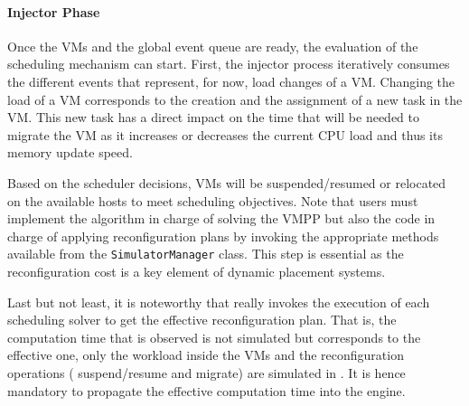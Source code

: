 \paragraph{Injector Phase}
Once the VMs and the global event queue are ready, the evaluation of
the scheduling mechanism can start. First, the injector process
iteratively consumes the different events that represent, for now, load changes of a VM.
Changing the load of
a VM corresponds to the creation and the assignment of a new \sg task
in the VM. This new task has a direct impact on the time that will be
needed to migrate the VM as it increases or decreases the current CPU
load and thus %
its memory update speed.
%

Based on the scheduler decisions, VMs will be suspended/resumed
or relocated on the available hosts to meet scheduling objectives. %
Note that users must implement the algorithm in
charge of solving the VMPP but also the code in charge of applying
reconfiguration plans by invoking the appropriate methods available
from the \texttt{SimulatorManager} class. This step is essential as
the reconfiguration cost is a key element of dynamic placement
systems.

Last but not least, it is noteworthy that \vmps really invokes the
execution of each scheduling solver to get the effective
reconfiguration plan.  That is, the computation time that is observed
is not simulated but corresponds to the effective one, only the
workload inside the VMs and the reconfiguration operations (\ie
suspend/resume and migrate)  are simulated in
\sg. It is hence mandatory to propagate the effective computation time into
the \sg engine.%


